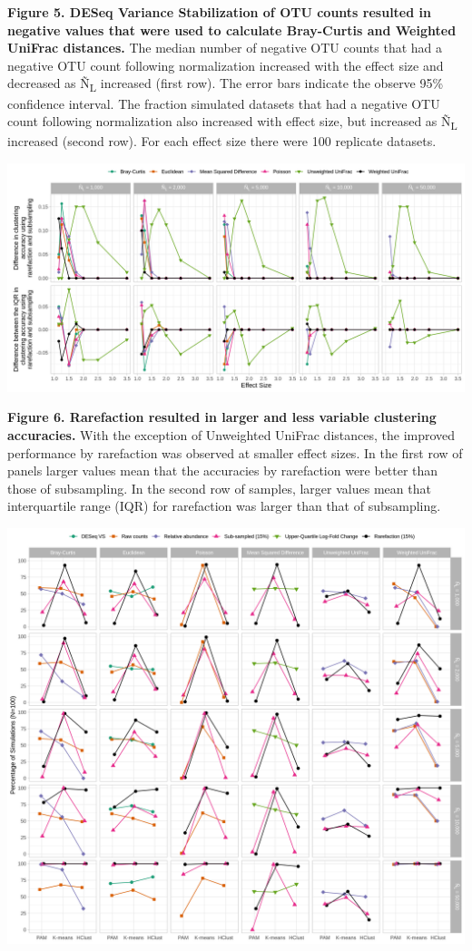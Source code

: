 \documentclass[
]{article}
\begin{document}
\textbf{Figure 5. DESeq Variance Stabilization of OTU counts resulted in
negative values that were used to calculate Bray-Curtis and Weighted
UniFrac distances.} The median number of negative OTU counts that had a
negative OTU count following normalization increased with the effect
size and decreased as Ñ\textsubscript{L} increased (first row). The
error bars indicate the observe 95\% confidence interval. The fraction
simulated datasets that had a negative OTU count following normalization
also increased with effect size, but increased as Ñ\textsubscript{L}
increased (second row). For each effect size there were 100 replicate
datasets.

\newpage

\includegraphics{figure_06.png}

\textbf{Figure 6. Rarefaction resulted in larger and less variable
clustering accuracies.} With the exception of Unweighted UniFrac
distances, the improved performance by rarefaction was observed at
smaller effect sizes. In the first row of panels larger values mean that
the accuracies by rarefaction were better than those of subsampling. In
the second row of samples, larger values mean that interquartile range
(IQR) for rarefaction was larger than that of subsampling.

\newpage

\includegraphics{figure_07.png}
\end{document}
